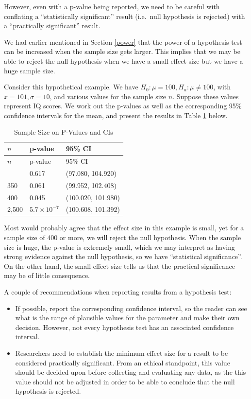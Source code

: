 \documentclass[
]{book}
\theoremstyle{definition}
\theoremstyle{definition}
\theoremstyle{definition}
\theoremstyle{definition}
\theoremstyle{remark}
\begin{document}
However, even with a p-value being reported, we need to be careful with conflating a ``statistically significant'' result (i.e.~null hypothesis is rejected) with a ``practically significant'' result.

We had earlier mentioned in Section \ref{power} that the power of a hypothesis test can be increased when the sample size gets larger. This implies that we may be able to reject the null hypothesis when we have a small effect size but we have a huge sample size.

Consider this hypothetical example. We have \(H_0: \mu = 100, H_a: \mu \neq 100\), with \(\bar{x} = 101, \sigma=10\), and various values for the sample size \(n\). Suppose these values represent IQ scores. We work out the p-values as well as the corresponding 95\% confidence intervals for the mean, and present the results in Table \ref{tab:practical} below.

\begin{longtable}[]{@{}lll@{}}
\caption{\label{tab:practical} Sample Size on P-Values and CIs}\tabularnewline
\toprule\noalign{}
\(n\) & p-value & 95\% CI \\
\midrule\noalign{}
\endfirsthead
\toprule\noalign{}
\(n\) & p-value & 95\% CI \\
\midrule\noalign{}
\endhead
\bottomrule\noalign{}
\endlastfoot
25 & 0.617 & (97.080, 104.920) \\
350 & 0.061 & (99.952, 102.408) \\
400 & 0.045 & (100.020, 101.980) \\
2,500 & \(5.7 \times 10^{-7}\) & (100.608, 101.392) \\
\end{longtable}

Most would probably agree that the effect size in this example is small, yet for a sample size of 400 or more, we will reject the null hypothesis. When the sample size is huge, the p-value is extremely small, which we may interpret as having strong evidence against the null hypothesis, so we have ``statistical significance''. On the other hand, the small effect size tells us that the practical significance may be of little consequence.

A couple of recommendations when reporting results from a hypothesis test:

\begin{itemize}
\item
  If possible, report the corresponding confidence interval, so the reader can see what is the range of plausible values for the parameter and make their own decision. However, not every hypothesis test has an associated confidence interval.
\item
  Researchers need to establish the minimum effect size for a result to be considered practically significant. From an ethical standpoint, this value should be decided upon before collecting and evaluating any data, as the this value should not be adjusted in order to be able to conclude that the null hypothesis is rejected.
\end{itemize}
\end{document}
